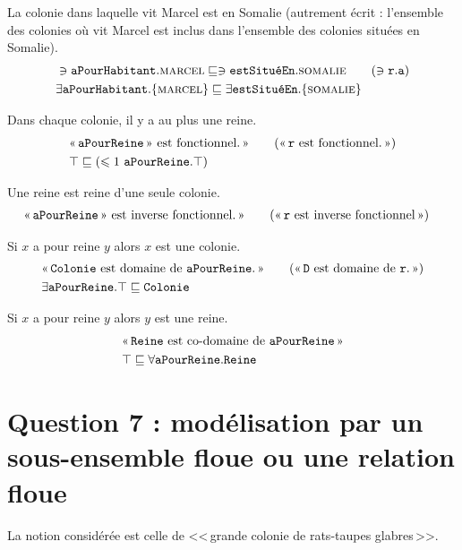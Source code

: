 \documentclass[11pt, a4paper]{article}
\def\fm#1{\text{\texttt{#1}}}
\def\roleR{\fm{r}}
\def\instanceA{\fm{a}}
\def\conceptD{\fm{D}}
\def\subsumepar{\sqsubseteq}
\begin{document}
	La colonie dans laquelle vit Marcel est en Somalie
	(autrement écrit : l'ensemble des colonies où vit Marcel
	est inclus dans l'ensemble des colonies situées en Somalie).
	\begin{align*}
	&\ni\aPourHabitant.\marcel
	\subsumepar
	\ni\estSitueEn.\somalie
	\tag{$\ni\roleR.\instanceA$}
	\\
	&\exists\aPourHabitant.\{\marcel\}
	\subsumepar
	\exists\estSitueEn.\{\somalie\}
	\end{align*}
	
	Dans chaque colonie, il y a au plus une reine.
	\begin{align*}
	&\text{<<\,$\aPourReine$\,>> est fonctionnel.\,>>}
	\tag{<<\,$\roleR$ est fonctionnel.\,>>}
	\\
	&\top\subsumepar(\leqslant 1 ~ \aPourReine . \top)
	\end{align*}
	
	Une reine est reine d'une seule colonie.
	\begin{align*}
	&\text{<<\,$\aPourReine$\,>> est inverse fonctionnel.\,>>}
	\tag{<<\,$\roleR$ est inverse fonctionnel\,>>}
	\end{align*}
	
	Si $x$ a pour reine $y$ alors $x$ est une colonie.
	\begin{align*}
	&\text{<<\,$\Colonie$ est domaine de $\aPourReine$.\,>>}
	\tag{<<\,$\conceptD$ est domaine de $\roleR$.\,>>}
	\\
	&\exists\aPourReine.\top \subsumepar \Colonie
	\end{align*}
	
	Si $x$ a pour reine $y$ alors $y$ est une reine.
	\begin{align*}
	&\text{<<\,$\Reine$ est co-domaine de $\aPourReine$\,>>}
	\\
	&\top \subsumepar \forall \aPourReine.\Reine
	\end{align*}
	
	\egroup
	
	\section*{Question 7 : modélisation par un sous-ensemble floue ou une relation floue}
	
	\def\GCRTG{\fm{GCRTG}}
	\def\nbRTG{\fm{nb\_rtg}}
	
	La notion considérée est celle de <<\,grande colonie de rats-taupes glabres\,>>.
	
\end{document}
